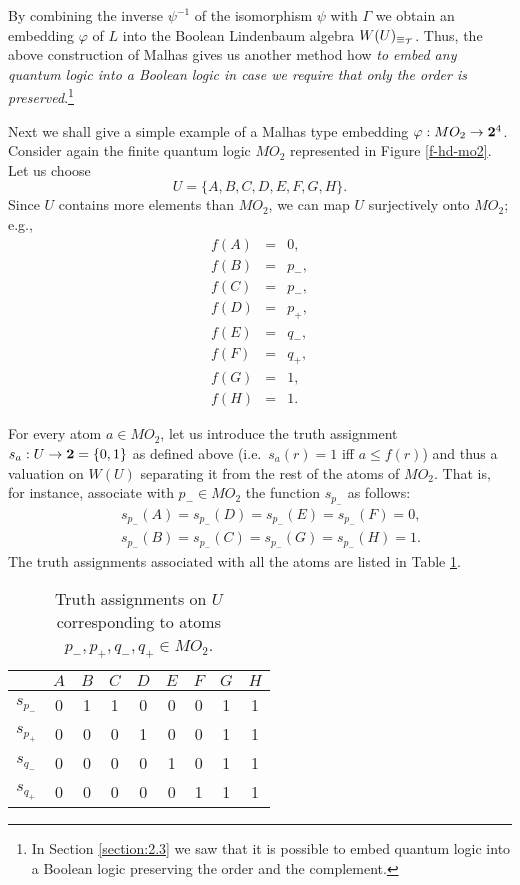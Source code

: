 By combining the inverse $\psi^{-1}$ of the isomorphism $\psi$ with $\Gamma$
we obtain an embedding $\varphi$ of $L$ into the Boolean Lindenbaum algebra
$W(U)_{\equiv_{{\cal T}}}$. Thus,
the above construction of Malhas gives us another method how {\em to embed
any quantum logic
into a Boolean logic in case we require that only the  order is
preserved}.\footnote{In Section \ref{section:2.3} we saw that it is possible to
embed quantum
logic into a Boolean logic preserving the order and the complement.}

Next we shall give a simple example of a Malhas type embedding
$\varphi : MO_2 \rightarrow {\bf 2}^4$. Consider
again the finite
quantum logic $MO_2$ represented in  Figure \ref{f-hd-mo2}.
Let us choose
$$U=\{A,B,C,D,E,F,G,H\}.$$
Since $U$ contains more elements than $MO_2$, we can map $U$ surjectively
onto $MO_2$; e.g.,
\begin{eqnarray*}
f(A)&=& 0,\\
f(B)&=& p_-,\\
f(C)&=& p_-,\\
f(D)&=& p_+,\\
f(E)&=& q_-,\\
f(F)&=& q_+,\\
f(G)&=& 1,\\
f(H)&=& 1.
\end{eqnarray*}

For every atom  $a \in MO_2$, let us introduce the truth assignment
$s_{a}:U\rightarrow {\bf 2}=\{0,1\}$ as defined above
(i.e.\ $s_a(r)=1$ iff $a \leq f(r)$) and
thus a valuation on $W(U)$ separating it from the rest of the atoms of
$MO_2$. That is, for instance, associate with $p_-\in MO_2$ the function
$s_{p_-}$
 as follows:
\begin{eqnarray*}
&&s_{p_-}(A)=s_{p_-}(D)=s_{p_-}(E)=s_{p_-}(F)=0,\\
&&s_{p_-}(B)=s_{p_-}(C)=s_{p_-}(G)=s_{p_-}(H)=1.
\end{eqnarray*}
The truth assignments associated with all the atoms are listed
in Table \ref{t-mo2-tvs2}.
\begin{table}
\begin{center}
\begin{tabular}{|c|cccccccc|}
\hline\hline
      &$A$& $B$& $C$& $D$& $E$& $F$& $G$& $H$\\
\hline
$s_{p_{-}}$ &0  &  1&     1 &   0 &0  &  0&     1 &   1 \\
$s_{p_{+}}$ &0  &  0&     0 &   1 &0  &  0&     1 &   1 \\
$s_{q_{-}}$ &0  &  0&     0 &   0 &1  &  0&     1 &   1 \\
$s_{q_{+}}$ &0  &  0&     0 &   0 &0  &  1&     1 &   1 \\
\hline\hline
\end{tabular}
\end{center}
\caption{Truth assignments on $U$ corresponding to
atoms $p_{-},p_{+},q_{-},q_{+}\in MO_{2}$.
\label{t-mo2-tvs2}}
\end{table}

